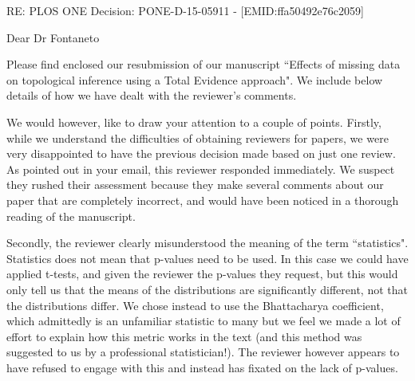 \documentclass[11pt]{letter}
\begin{document}
\begin{letter}{}

RE: PLOS ONE Decision: PONE-D-15-05911 - [EMID:ffa50492e76c2059]

Dear Dr Fontaneto

Please find enclosed our resubmission of our manuscript ``Effects of missing data on topological inference using a Total Evidence approach". We include below details of how we have dealt with the reviewer's comments.

We would however, like to draw your attention to a couple of points. Firstly, while we understand the difficulties of obtaining reviewers for papers, we were very disappointed to have the previous decision made based on just one review. As pointed out in your email, this reviewer responded immediately. We suspect they rushed their assessment because they make several comments about our paper that are completely incorrect, and would have been noticed in a thorough reading of the manuscript. 




Secondly, the reviewer clearly misunderstood the meaning of the term ``statistics". Statistics does not mean that p-values need to be used. In this case we could have applied t-tests, and given the reviewer the p-values they request, but this would only tell us that the means of the distributions are significantly different, not that the distributions differ. We chose instead to use the Bhattacharya coefficient, which admittedly is an unfamiliar statistic to many but we feel we made a lot of effort to explain how this metric works in the text (and this method was suggested to us by a professional statistician!). The reviewer however appears to have refused to engage with this and instead has fixated on the lack of p-values.




\end{letter}
\end{document}
